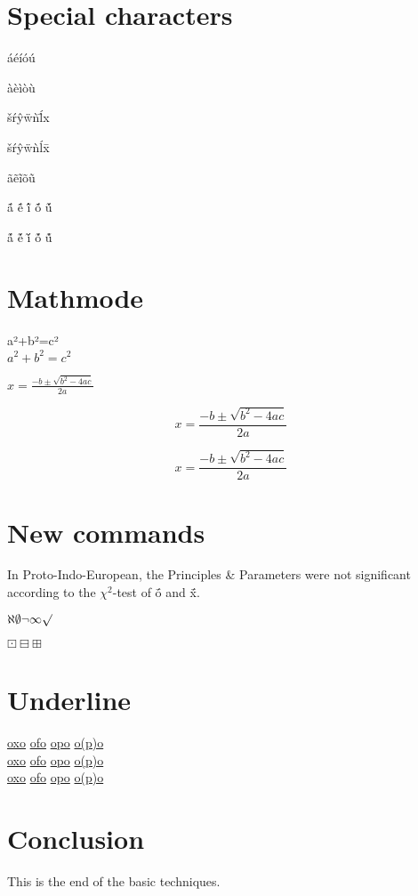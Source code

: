 \documentclass{scrartcl}
\begin{document}
\section{Special characters}
áéíóú

àèìòù

šŕŷẅǹĺ̄x

\v s\'r\^y\"w\`n\'l\=x 

ãẽĩõũ

{\'{\~{a}}}
{\'{\~{e}}}
{\'{\~{i}}}
{\'{\~{o}}}
{\'{\~{u}}}

{\~{\'{a}}}
{\~{\'{e}}}
{\~{\'{i}}}
{\~{\'{o}}}
{\~{\'{u}}}

\section{Mathmode}

\noindent
a²+b²=c²\\
$a^2+b^2=c^2$

$x = \frac{-b \pm \sqrt{b^2-4ac}}{2a} $

$$x = \frac{-b \pm \sqrt{b^2-4ac}}{2a} $$

\[x = \frac{-b \pm \sqrt{b^2-4ac}}{2a}\]


\section{New commands}
\newcommand{\PIE}{Proto-Indo-European}
\newcommand{\PP}{Principles \& Parameters}
\newcommand{\chisquare}{$\chi^2$}
\newcommand{\macronacuteo}{\'{\={o}}}
\newcommand{\macronacute}[1]{\'{\={#1}}}

In {\PIE}, the {\PP} were not significant according to the {\chisquare}-test of \macronacuteo{} and \macronacute{x}.

$\aleph \emptyset \neg \infty \surd$

\textinterrobang \textreferencemark \texttildelow $\boxdot\boxminus\boxplus$

\section{Underline}
 \underline{oxo} \underline{ofo} \underline{opo} \underline{o(p)o}\\
 \uline{oxo} \uline{ofo} \uline{opo} \uline{o(p)o}\\
 \ul{oxo} \ul{ofo} \ul{opo} \ul{o(p)o}\\
 
\section{Conclusion}\label{sec:conclusion} 
This is the end of the basic techniques.
\end{document}
